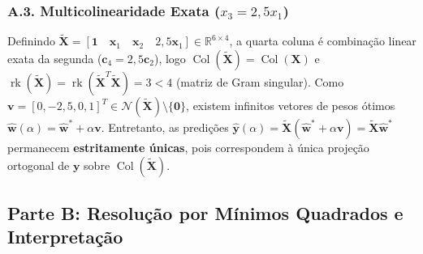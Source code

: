 \documentclass[11pt,a4paper]{article}
\begin{document}
\subsubsection*{A.3. Multicolinearidade Exata ($x_3 = 2{,}5x_1$)}
Definindo $\tilde{\mathbf{X}} = [\mathbf{1} \quad \mathbf{x}_1 \quad \mathbf{x}_2 \quad 2{,}5\mathbf{x}_1] \in \mathbb{R}^{6 \times 4}$, a quarta coluna é combinação linear exata da segunda ($\mathbf{c}_4 = 2{,}5\mathbf{c}_2$), logo $\operatorname{Col}(\tilde{\mathbf{X}}) = \operatorname{Col}(\mathbf{X})$ e $\operatorname{rk}(\tilde{\mathbf{X}}) = \operatorname{rk}(\tilde{\mathbf{X}}^T\tilde{\mathbf{X}}) = 3 < 4$ (matriz de Gram singular). Como $\mathbf{v} = [0, -2{,}5, 0, 1]^T \in \mathcal{N}(\tilde{\mathbf{X}}) \setminus \{\mathbf{0}\}$, existem infinitos vetores de pesos ótimos $\hat{\mathbf{w}}(\alpha) = \hat{\mathbf{w}}^* + \alpha\mathbf{v}$. Entretanto, as predições $\hat{\mathbf{y}}(\alpha) = \tilde{\mathbf{X}}(\hat{\mathbf{w}}^* + \alpha\mathbf{v}) = \tilde{\mathbf{X}}\hat{\mathbf{w}}^*$ permanecem \textbf{estritamente únicas}, pois correspondem à única projeção ortogonal de $\mathbf{y}$ sobre $\operatorname{Col}(\tilde{\mathbf{X}})$.

\subsection{Parte B: Resolução por Mínimos Quadrados e Interpretação}
\end{document}
